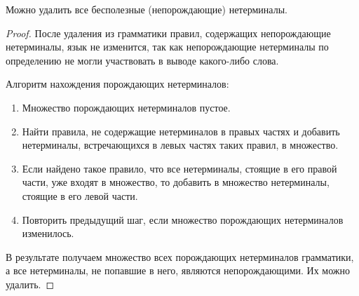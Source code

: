 \begin{lemma}
    Можно удалить все бесполезные (непорождающие) нетерминалы.
\end{lemma}

\begin{proof}
    После удаления из грамматики правил, содержащих непорождающие нетерминалы, язык не изменится, так как непорождающие нетерминалы по определению не могли участвовать в выводе какого-либо слова.

    Алгоритм нахождения порождающих нетерминалов:
    \begin{enumerate}
        \item Множество порождающих нетерминалов пустое.
        \item Найти правила, не содержащие нетерминалов в правых частях и добавить нетерминалы, встречающихся в левых частях таких правил, в множество.
        \item Если найдено такое правило, что все нетерминалы, стоящие в его правой части, уже входят в множество, то добавить в множество нетерминалы, стоящие в его левой части.
        \item Повторить предыдущий шаг, если множество порождающих нетерминалов изменилось.
    \end{enumerate}
    В результате получаем множество всех порождающих нетерминалов грамматики, а все нетерминалы, не попавшие в него, являются непорождающими.
    Их можно удалить.
\end{proof}

